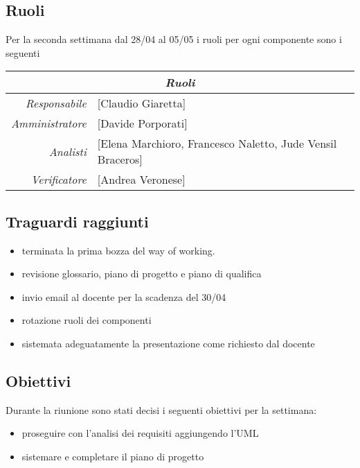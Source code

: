 \documentclass[12pt]{article}
\begin{document}
\subsection{Ruoli}
Per la seconda settimana dal 28/04 al 05/05 i ruoli per ogni componente sono i seguenti
\\
\begin{tabular}{r | l}
    \multicolumn{2}{c}{\textit{Ruoli}}\\
    \hline
        \textit{Responsabile} &
        [Claudio Giaretta]\makecell{}\\
        \textit{Amministratore} &
        [Davide Porporati]\makecell{}\\
        \textit{Analisti} &
        [Elena Marchioro, Francesco Naletto, Jude Vensil Braceros]\makecell{}\\
        \textit{Verificatore} & 
        [Andrea Veronese]\makecell{}\\
\end{tabular}

\subsection{Traguardi raggiunti}
\begin{itemize}
    \item terminata la prima bozza del way of working.
    \item revisione glossario, piano di progetto e piano di qualifica
    \item invio email al docente per la scadenza del 30/04
    \item rotazione ruoli dei componenti
    \item sistemata adeguatamente la presentazione come richiesto dal docente
\end{itemize}

\subsection{Obiettivi}
Durante la riunione sono stati decisi i seguenti obiettivi per la settimana:
\begin{itemize}
    \item proseguire con l'analisi dei requisiti aggiungendo l'UML
    \item sistemare e completare il piano di progetto


\end{itemize}
\end{document}
